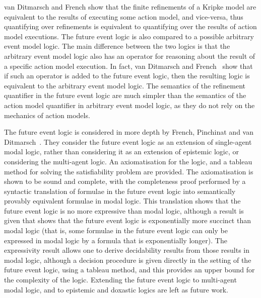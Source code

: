 van Ditmarsch and French show that the finite refinements of a Kripke
model are equivalent to the results of executing some action model, and
vice-versa, thus quantifying over refinements is equivalent to quantifying over
the results of action model executions. The future event logic is also compared
to a possible arbitrary event model logic. The main difference between the two
logics is that the arbitrary event model logic also has an operator for
reasoning about the result of a specific action model execution. In fact, van
Ditmarsch and French~\cite{french2009simulation} show that if such an operator
is added to the future event logic, then the resulting logic is equivalent to
the arbitrary event model logic. The semantics of the refinement quantifier in
the future event logic are much simpler than the semantics of the action model
quantifier in arbitrary event model logic, as they do not rely on the mechanics
of action models.

The future event logic is considered in more depth by French, Pinchinat and van
Ditmarsch~\cite{french2010future}. They consider the future event logic as an
extension of single-agent modal logic, rather than considering it as an
extension of epistemic logic, or considering the multi-agent logic.  An
axiomatisation for the logic, and a tableau method for solving the
satisfiability problem are provided. The axiomatisation is shown to be sound and
complete, with the completeness proof performed by a syntactic translation of
formulae in the future event logic into semantically provably equivalent
formulae in modal logic. This translation shows that the future event logic is
no more expressive than modal logic, although a result is given that shows that
the future event logic is exponentially more succinct than modal logic (that is,
some formulae in the future event logic can only be expressed in modal logic by
a formula that is exponentially longer). The expressivity result allows one to
derive decidability results from those results in modal logic, although a
decision procedure is given directly in the setting of the future event logic,
using a tableau method, and this provides an upper bound for the complexity of
the logic. Extending the future event logic to multi-agent modal logic, and to
epistemic and doxastic logics are left as future work.
